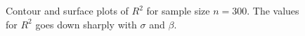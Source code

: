\documentclass{article}
\begin{document}
\begin{figure}[hbtp]
   \centering
       \caption{Contour and surface plots of $R^2$ for sample size $n =300$. The values for $R^2$ goes down sharply with $\sigma$ and $\beta$.}
       \label{fig:contour_rsq}
\end{figure}
\end{document}

